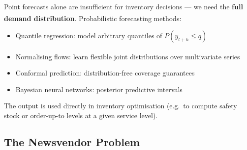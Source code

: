 \begin{tcbitemize}[ skin=sectionraster ]
    \tcbitem[title=Probabilistic Forecasting, raster multicolumn=3]
    Point forecasts alone are insufficient for inventory decisions --- we need the \textbf{full demand distribution}\textsuperscript{\cite[][p.~37]{wickDemandForecastingIndividual2021}}.
    Probabilistic forecasting methods:
    \begin{itemize}
        \item Quantile regression: model arbitrary quantiles of $P(y_{t+h} \le q)$
        \item Normalising flows: learn flexible joint distributions over multivariate series\textsuperscript{\cite{rasulMultivariateProbabilisticTime2021}}
        \item Conformal prediction: distribution-free coverage guarantees
        \item Bayesian neural networks: posterior predictive intervals
    \end{itemize}
    The output is used directly in inventory optimisation (e.g.\ to compute safety stock or order-up-to levels at a given service level).

\end{tcbitemize}

\subsection{The Newsvendor Problem}

